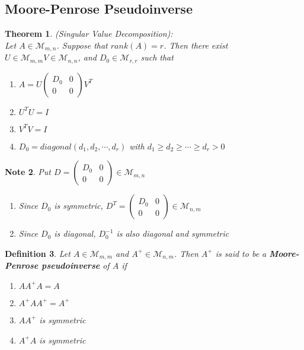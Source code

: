 \documentclass[12pt]{amsart}
\newtheorem{thm}{Theorem}[section]
\newtheorem{defn}[thm]{Definition}
\newtheorem{note}[thm]{Note}
\newcommand{\MM}{\mathcal{M}}
\begin{document}
\subsection{Moore-Penrose Pseudoinverse}

\begin{thm} (Singular Value Decomposition): \\
Let $A \in \MM_{m,n}$. Suppose that $rank(A) = r$. Then there exist $U \in \MM_{m,m} V \in \MM_{n,n}$, and $D_0 \in \MM_{r,r}$ such that
\begin{enumerate}
\item $A = 
U
\begin{pmatrix}
D_0 & 0 \\
0 & 0
\end{pmatrix}
V^T
$
\item  
$U^T
U = I$
\item $V^T
V = I$ 
\item $D_0 = diagonal(d_1, d_2, \cdots, d_r)$ with $d_1 \geq d_2 \geq \cdots \geq d_r >0$
\end{enumerate}

\end{thm}

\begin{note}
Put $D = 
\begin{pmatrix}
D_0 & 0 \\
0 & 0
\end{pmatrix} \in \MM_{m,n}$ 
\begin{enumerate}
\item Since $D_0$ is symmetric, $D^T = 
\begin{pmatrix}
D_0 & 0 \\
0 & 0
\end{pmatrix}  \in \MM_{n,m}$
\item Since $D_0$ is diagonal, $D_0^{-1}$ is also diagonal and symmetric
\end{enumerate}
\end{note}

\begin{defn}
Let $A \in \MM_{m,m}$ and $A^+ \in \MM_{n,m}$. Then $A^+$ is said to be a  \textbf{Moore-Penrose pseudoinverse} of $A$ if 
\begin{enumerate}
\item $AA^+A = A$
\item $A^+AA^+ = A^+$
\item $AA^+$ is symmetric
\item $A^+A$ is symmetric
\end{enumerate} 
\end{defn}
\end{document}
